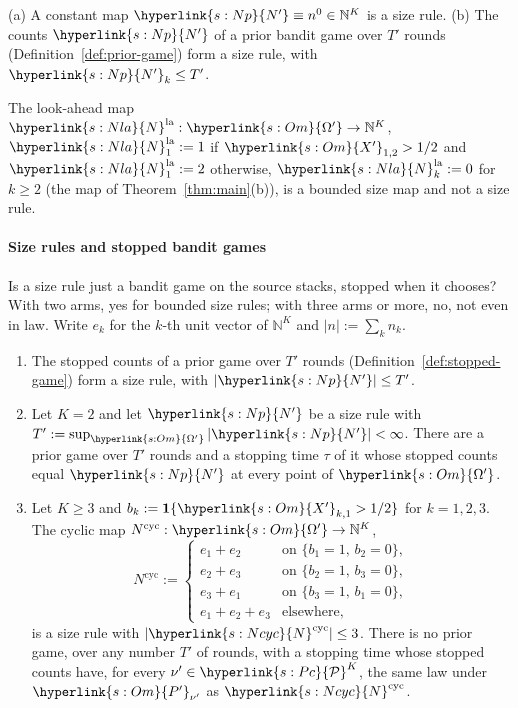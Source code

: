 \documentclass[11pt]{article}
\newcommand{\dt}[1]{\hypertarget{#1}{}}
\newcommand{\sy}[2]{\hyperlink{#1}{#2}}
\newcommand{\N}{\mathbb{N}}
\newcommand{\ind}{\mathbf{1}}
\newcommand{\Pc}{\sy{s:Pc}{\mathcal{P}}}
\newcommand{\Nla}{\sy{s:Nla}{N}^{\mathrm{la}}}
\newcommand{\Np}{\sy{s:Np}{N'}}
\newcommand{\Om}{\sy{s:Om}{\Omega'}}
\newcommand{\Xp}{\sy{s:Om}{X'}}
\newcommand{\Pp}{\sy{s:Om}{P'}}
\newcommand{\Ncyc}{\sy{s:Ncyc}{N}^{\mathrm{cyc}}}
\begin{document}
\begin{lemma}\label{lem:prior-game}
(a) A constant map $\Np\equiv n^0\in\N^K$ is a size rule. (b) The counts $\Np$ of a prior bandit game
over $T'$ rounds (Definition~\ref{def:prior-game}) form a size rule, with $\Np_k\le T'$.
\end{lemma}

\begin{lemma}\label{lem:lookahead}
The look-ahead map $\Nla:\Om\to\N^K$, $\Nla_1:=1$ if $\Xp_{1,2}>1/2$ and $\Nla_1:=2$ otherwise,
$\Nla_k:=0$ for $k\ge2$ (the map of Theorem~\ref{thm:main}(b)), is a bounded size map and not a
size rule.
\end{lemma}

\paragraph{Size rules and stopped bandit games} Is a size rule just a bandit game on the source
stacks, stopped when it chooses? With two arms, yes for bounded size rules; with three arms or more,
no, not even in law. Write\dt{s:ek} $e_k$ for the $k$-th unit vector of $\N^K$ and $|n|:=\sum_kn_k$.

\begin{proposition}\label{prop:stopped-games}
\begin{enumerate}
\item[(a)] The stopped counts of a prior game over $T'$ rounds (Definition~\ref{def:stopped-game})
  form a size rule, with $|\Np|\le T'$.
\item[(b)] Let $K=2$ and let $\Np$ be a size rule with $T':=\sup_{\Om}|\Np|<\infty$. There are a
  prior game over $T'$ rounds and a stopping time $\tau$ of it whose stopped counts equal $\Np$ at
  every point of $\Om$.
\item[(c)] Let $K\ge3$ and $b_k:=\ind\{\Xp_{k,1}>1/2\}$ for $k=1,2,3$. The cyclic map
  $N^{\mathrm{cyc}}:\Om\to\N^K$,\dt{s:Ncyc}
  \begin{equation*}
  N^{\mathrm{cyc}}:=\begin{cases}
  e_1+e_2&\text{on }\{b_1=1,\,b_2=0\},\\
  e_2+e_3&\text{on }\{b_2=1,\,b_3=0\},\\
  e_3+e_1&\text{on }\{b_3=1,\,b_1=0\},\\
  e_1+e_2+e_3&\text{elsewhere},
  \end{cases}
  \end{equation*}
  is a size rule with $|\Ncyc|\le3$. There is no prior game, over any number $T'$ of rounds, with a
  stopping time whose stopped counts have, for every $\nu'\in\Pc^K$, the same law under $\Pp_{\nu'}$
  as $\Ncyc$.
\end{enumerate}
\end{proposition}
\end{document}
